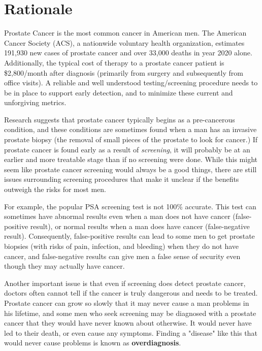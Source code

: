 %
%
%

\section{Rationale}

Prostate Cancer is the most common cancer in American men. The American Cancer Society (ACS), a nationwide voluntary health organization, estimates 191,930 new cases of prostate cancer and over 33,000 deaths in year 2020 alone. Additionally, the typical cost of therapy to a prostate cancer patient is \$2,800/month after diagnosis (primarily from surgery and subsequently from office visits). A reliable and well understood testing/screening procedure needs to be in place to support early detection, and to minimize these current and unforgiving metrics. \par

Research suggests that prostate cancer typically begins as a pre-cancerous condition, and these conditions are sometimes found when a man has an invasive prostate biopsy (the removal of small pieces of the prostate to look for cancer.) If prostate cancer is found early as a result of \textit{screening}, it will probably be at an earlier and more treatable stage than if no screening were done. While this might seem like prostate cancer screening would always be a good things, there are still issues surrounding screening procedures that make it unclear if the benefits outweigh the risks for most men. \par

For example, the popular PSA screening test is not 100\% accurate. This test can sometimes have abnormal results even when a man does not have cancer (false-positive result), or normal results when a man does have cancer (false-negative result). Consequently, false-positive results can lead to some men to get prostate biopsies (with risks of pain, infection, and bleeding) when they do not have cancer, and false-negative results can give men a false sense of security even though they may actually have cancer. \par

Another important issue is that even if screening does detect prostate cancer, doctors often cannot tell if the cancer is truly dangerous and needs to be treated. Prostate cancer can grow so slowly that it may never cause a man problems in his lifetime, and some men who seek screening may be diagnosed with a prostate cancer that they would have never known about otherwise. It would never have led to their death, or even cause any symptoms. Finding a "disease" like this that would never cause problems is known as \textbf{overdiagnosis}. \par

